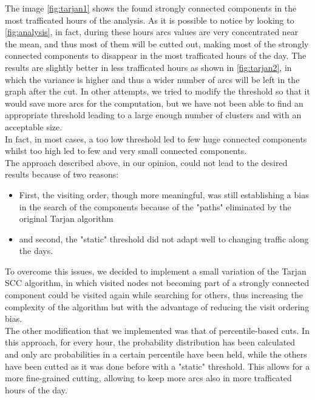 \documentclass[12pt,a4paper]{article}
\begin{document}
The image \ref{fig:tarjan1} shows the found strongly connected components in the most trafficated hours 
of the analysis. As it is possible to notice by looking to \ref{fig:analysis}, in fact, during
these hours arcs values are very concentrated near the mean, and thus most of them will be cutted out, making
most of the strongly connected components to disappear in the most trafficated hours of the day.
The results are slightly better in less trafficated hours as shown in \ref{fig:tarjan2}, in which the variance is higher and thus a wider number
of arcs will be left in the graph after the cut.
In other attempts, we tried to modify the threshold so that it would save more arcs for the computation,
but we have not been able to find an appropriate threshold leading to a large enough number of clusters
and with an acceptable size.\\
In fact, in most cases, a too low threshold led to few huge connected components whilst too high led to few and very small
connected components.\\
The approach described above, in our opinion, could not lead to the desired results because of two reasons:
\begin{itemize}
\item First, the visiting order, though more meaningful, was still establishing a bias in the search of the components because
of the "paths" eliminated by the original Tarjan algorithm
\item and second, the "static" threshold did not adapt well to changing traffic along the days.
\end{itemize}
To overcome this issues, we decided to implement a small variation of the Tarjan SCC algorithm, in which visited nodes not
becoming part of a strongly connected component could be visited again while searching for others, thus increasing the
complexity of the algorithm but with the advantage of reducing the visit ordering bias.
\\
The other modification that we implemented was that of percentile-based cuts. In this approach, for every hour, the probability
distribution has been calculated and only arc probabilities in a certain percentile have been held, while the others
have been cutted as it was done before with a "static" threshold. This allows for a more fine-grained cutting, allowing
to keep more arcs also in more trafficated hours of the day.
\end{document}
